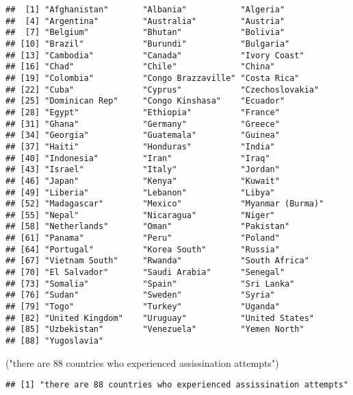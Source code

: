 \documentclass[
]{article}
\newenvironment{Shaded}{\begin{snugshade}}{\end{snugshade}}
\newcommand{\NormalTok}[1]{#1}
\newcommand{\StringTok}[1]{\textcolor[rgb]{0.31,0.60,0.02}{#1}}
\begin{document}
\begin{verbatim}
##  [1] "Afghanistan"       "Albania"           "Algeria"          
##  [4] "Argentina"         "Australia"         "Austria"          
##  [7] "Belgium"           "Bhutan"            "Bolivia"          
## [10] "Brazil"            "Burundi"           "Bulgaria"         
## [13] "Cambodia"          "Canada"            "Ivory Coast"      
## [16] "Chad"              "Chile"             "China"            
## [19] "Colombia"          "Congo Brazzaville" "Costa Rica"       
## [22] "Cuba"              "Cyprus"            "Czechoslovakia"   
## [25] "Dominican Rep"     "Congo Kinshasa"    "Ecuador"          
## [28] "Egypt"             "Ethiopia"          "France"           
## [31] "Ghana"             "Germany"           "Greece"           
## [34] "Georgia"           "Guatemala"         "Guinea"           
## [37] "Haiti"             "Honduras"          "India"            
## [40] "Indonesia"         "Iran"              "Iraq"             
## [43] "Israel"            "Italy"             "Jordan"           
## [46] "Japan"             "Kenya"             "Kuwait"           
## [49] "Liberia"           "Lebanon"           "Libya"            
## [52] "Madagascar"        "Mexico"            "Myanmar (Burma)"  
## [55] "Nepal"             "Nicaragua"         "Niger"            
## [58] "Netherlands"       "Oman"              "Pakistan"         
## [61] "Panama"            "Peru"              "Poland"           
## [64] "Portugal"          "Korea South"       "Russia"           
## [67] "Vietnam South"     "Rwanda"            "South Africa"     
## [70] "El Salvador"       "Saudi Arabia"      "Senegal"          
## [73] "Somalia"           "Spain"             "Sri Lanka"        
## [76] "Sudan"             "Sweden"            "Syria"            
## [79] "Togo"              "Turkey"            "Uganda"           
## [82] "United Kingdom"    "Uruguay"           "United States"    
## [85] "Uzbekistan"        "Venezuela"         "Yemen North"      
## [88] "Yugoslavia"
\end{verbatim}

\begin{Shaded}
\begin{Highlighting}[]
\NormalTok{(}\StringTok{"there are 88 countries who experienced assissination attempts"}\NormalTok{)}
\end{Highlighting}
\end{Shaded}

\begin{verbatim}
## [1] "there are 88 countries who experienced assissination attempts"
\end{verbatim}
\end{document}
